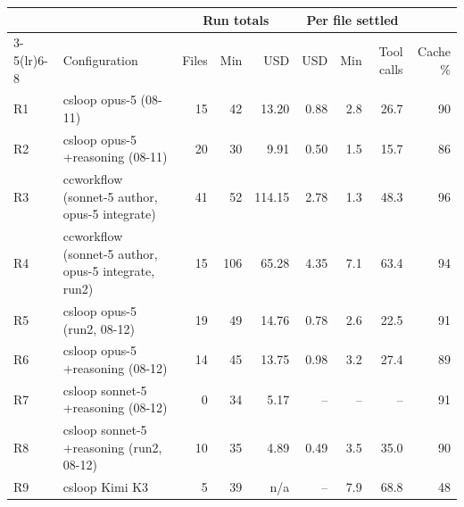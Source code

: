 \begin{tabular}{@{}llrrrrrrr@{}}
  \toprule
  & & \multicolumn{3}{c}{Run totals} & \multicolumn{3}{c}{Per file settled} & \\
  \cmidrule(lr){3-5}\cmidrule(lr){6-8}
  & Configuration & Files & Min & USD & USD & Min & Tool calls & Cache \%\\
  \midrule
    R1 & csloop opus-5 (08-11) & 15 & 42 & 13.20 & 0.88 & 2.8 & 26.7 & 90 \\
    R2 & csloop opus-5 +reasoning (08-11) & 20 & 30 & 9.91 & 0.50 & 1.5 & 15.7 & 86 \\
    R3 & ccworkflow (sonnet-5 author, opus-5 integrate) & 41 & 52 & 114.15 & 2.78 & 1.3 & 48.3 & 96 \\
    R4 & ccworkflow (sonnet-5 author, opus-5 integrate, run2) & 15 & 106 & 65.28 & 4.35 & 7.1 & 63.4 & 94 \\
    R5 & csloop opus-5 (run2, 08-12) & 19 & 49 & 14.76 & 0.78 & 2.6 & 22.5 & 91 \\
    R6 & csloop opus-5 +reasoning (08-12) & 14 & 45 & 13.75 & 0.98 & 3.2 & 27.4 & 89 \\
    R7 & csloop sonnet-5 +reasoning (08-12) & 0 & 34 & 5.17 & -- & -- & -- & 91 \\
    R8 & csloop sonnet-5 +reasoning (run2, 08-12) & 10 & 35 & 4.89 & 0.49 & 3.5 & 35.0 & 90 \\
    R9 & csloop Kimi K3 & 5 & 39 & n/a & -- & 7.9 & 68.8 & 48 \\
  \bottomrule
\end{tabular}
